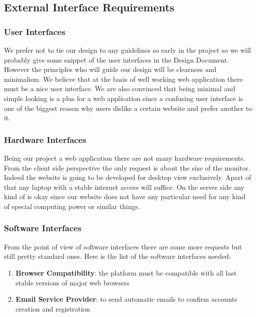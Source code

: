 

\subsection{External Interface Requirements}
    \subsubsection{User Interfaces}
    We prefer not to tie our design to any guidelines so early in the project so we will probably give some snippet of the user interfaces in the Design Document. However the principles who will guide our design will be clearness and minimalism. We believe that at the basis of well working web application there must be a nice user interface. We are also convinced that being minimal and simple looking is a plus for a web application since a confusing user interface is one of the biggest reason why users dislike a certain website and prefer another to it.

    \subsubsection{Hardware Interfaces}
    Being our project a web application there are not many hardware requirements. From the client side perspective the only request is about the size of the monitor. Indeed the website is going to be developed for desktop view exclusively. Apart of that any laptop with a stable internet access will suffice. On the server side any kind of is okay since our website does not have any particular need for any kind of special computing power or similar things.

    \subsubsection{Software Interfaces}
    From the point of view of software interfaces there are some more requests but still pretty standard ones. Here is the list of the software interfaces needed:
    \begin{enumerate}
        \item  \textbf{Browser Compatibility}: the platform must be compatible with all last stable versions of major web browsers
        \item \textbf{Email Service Provider}: to send automatic emails to confirm accounts creation and registration
    \end{enumerate}
